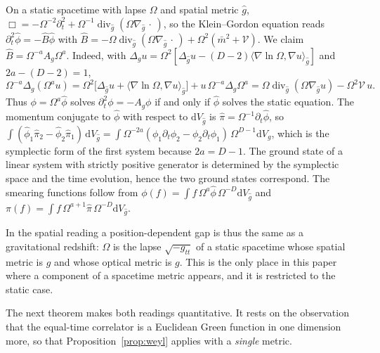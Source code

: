 \documentclass[11pt,a4paper]{article}
\makeatletter
\theoremstyle{stmt}
\theoremstyle{defn}
\theoremstyle{rmk}
\renewenvironment{proof}[1][\proofname]{\par\pushQED{\qed}\normalfont\topsep6\p@\@plus6\p@\relax
  \trivlist\item[\hskip\labelsep{\sffamily\itshape\small #1.}]\ignorespaces}{\popQED\endtrivlist\@endpefalse}
\numberwithin{equation}{section}
\newcommand{\dd}{\mathrm{d}}
\makeatother
\begin{document}
\begin{proof}
On a static spacetime with lapse $\Omega$ and spatial metric $\hat g$, $\Box=-\Omega^{-2}\partial_t^2+\Omega^{-1}\operatorname{div}_{\hat g}(\Omega\nabla_{\hat g}\,\cdot\,)$, so the Klein--Gordon equation reads $\partial_t^2\hat\phi=-\hat B\hat\phi$ with $\hat B=-\Omega\operatorname{div}_{\hat g}(\Omega\nabla_{\hat g}\,\cdot\,)+\Omega^2(\bar m^2+\mathcal V)$. We claim $\hat B=\Omega^{-a}A_g\Omega^{a}$. Indeed, with $\Delta_gu=\Omega^2[\Delta_{\hat g}u-(D-2)\langle\nabla\ln\Omega,\nabla u\rangle_{\hat g}]$ and $2a-(D-2)=1$,
\[
\Omega^{-a}\Delta_g(\Omega^{a}u)=\Omega^2\big[\Delta_{\hat g}u+\langle\nabla\ln\Omega,\nabla u\rangle_{\hat g}\big]+u\,\Omega^{-a}\Delta_g\Omega^{a}
=\Omega\operatorname{div}_{\hat g}(\Omega\nabla_{\hat g}u)-\Omega^2\mathcal V\,u .
\]
Thus $\phi=\Omega^{a}\hat\phi$ solves $\partial_t^2\phi=-A_g\phi$ if and only if $\hat\phi$ solves the static equation. The momentum conjugate to $\hat\phi$ with respect to $\dd V_{\hat g}$ is $\hat\pi=\Omega^{-1}\partial_t\hat\phi$, so $\int(\hat\phi_1\hat\pi_2-\hat\phi_2\hat\pi_1)\,\dd V_{\hat g}=\int\Omega^{-2a}(\phi_1\partial_t\phi_2-\phi_2\partial_t\phi_1)\,\Omega^{D-1}\dd V_g$, which is the symplectic form of the first system because $2a=D-1$. The ground state of a linear system with strictly positive generator is determined by the symplectic space and the time evolution, hence the two ground states correspond. The smearing functions follow from $\phi(f)=\int f\,\Omega^{a}\hat\phi\,\Omega^{-D}\dd V_{\hat g}$ and $\pi(f)=\int f\,\Omega^{a+1}\hat\pi\,\Omega^{-D}\dd V_{\hat g}$.
\end{proof}

In the spatial reading a position-dependent gap is thus the same as a gravitational redshift: $\Omega$ is the lapse $\sqrt{-g_{tt}}$ of a static spacetime whose spatial metric is $\hat g$ and whose optical metric is $g$. This is the only place in this paper where a component of a spacetime metric appears, and it is restricted to the static case.

The next theorem makes both readings quantitative. It rests on the observation that the equal-time correlator is a Euclidean Green function in one dimension more, so that Proposition~\ref{prop:weyl} applies with a \emph{single} metric.
\end{document}
